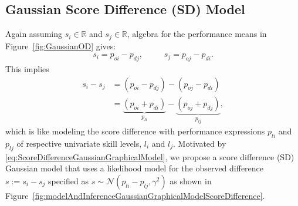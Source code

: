 \subsection{Gaussian Score Difference (SD) Model}

Again assuming $s_i \in \mathbb{R}$ and $s_j \in \mathbb{R}$,
algebra for the performance means in %
Figure~\ref{fig:GaussianOD} gives:
\begin{align}
s_i = p_{oi}-p_{dj}, \qquad \;\; s_j = p_{oj}-p_{di}.
\label{eq:ScoreDifferenceGaussianGraphicalModel}
\end{align}
This implies
\begin{align}
  s_i - s_j &= (p_{oi} - p_{dj}) - (p_{oj} - p_{di})  \nonumber \\
            &= \underbrace{(p_{oi}+p_{di})}_{p_{li}} - \underbrace{(p_{oj}+p_{dj})}_{p_{lj}},
\end{align}
\unindent which is like modeling the score difference with performance
expressions $p_{li}$ and $p_{lj}$ of respective univariate skill levels, $l_i$
and $l_j$.  Motivated by
\eqref{eq:ScoreDifferenceGaussianGraphicalModel}, we propose a score
difference (SD) Gaussian model that uses a likelihood model for the
observed difference $s := s_i - s_j$ specified as $s \sim
\mathcal{N}(p_{li} - p_{lj}, \gamma^2)$ as shown in
Figure~\ref{fig:modelAndInferenceGaussianGraphicalModelScoreDifference}.

